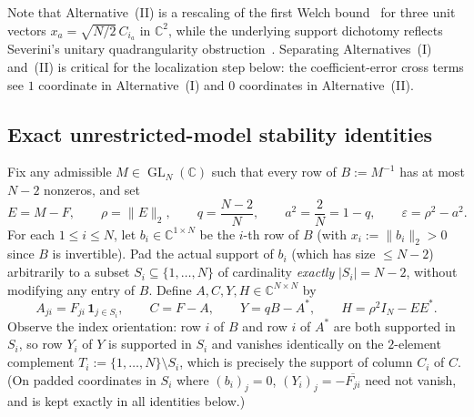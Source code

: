 \documentclass[11pt,reqno]{amsart}
\numberwithin{equation}{section}
\theoremstyle{definition}
\theoremstyle{remark}
\newcommand{\C}{\mathbb{C}}
\newcommand{\GL}{\operatorname{GL}}
\begin{document}
Note that Alternative~(II) is a rescaling of the first Welch bound~\cite{Wel74,DHC12} for three unit vectors $x_a = \sqrt{N/2}\,C_{i_a}$ in $\C^2$, while the underlying support dichotomy reflects Severini's unitary quadrangularity obstruction~\cite{Sev03}. Separating Alternatives~(I) and~(II) is critical for the localization step below: the coefficient-error cross terms see $1$ coordinate in Alternative~(I) and $0$ coordinates in Alternative~(II).

\subsection{Exact unrestricted-model stability identities}

Fix any admissible $M\in\GL_N(\C)$ such that every row of $B:=M^{-1}$ has at most $N-2$ nonzeros, and set
\begin{equation}
\label{eq:params-codim2}
E = M - F,\qquad \rho = \|E\|_2,\qquad q = \frac{N-2}{N},\qquad a^2 = \frac{2}{N} = 1 - q,\qquad \varepsilon = \rho^2 - a^2.
\end{equation}
For each $1\le i\le N$, let $b_i\in\C^{1\times N}$ be the $i$-th row of $B$ (with $x_i := \|b_i\|_2 > 0$ since $B$ is invertible). Pad the actual support of $b_i$ (which has size $\le N-2$) arbitrarily to a subset $S_i\subseteq\{1,\ldots,N\}$ of cardinality \emph{exactly} $|S_i|=N-2$, without modifying any entry of $B$. Define $A,C,Y,H\in\C^{N\times N}$ by
\begin{equation}
\label{eq:ACYH-def}
A_{ji} = F_{ji}\,\mathbf{1}_{j\in S_i},\qquad
C = F - A,\qquad
Y = qB - A^*,\qquad
H = \rho^2 I_N - EE^*.
\end{equation}
Observe the index orientation: row $i$ of $B$ and row $i$ of $A^*$ are both supported in $S_i$, so row $Y_i$ of $Y$ is supported in $S_i$ and vanishes identically on the $2$-element complement $T_i := \{1,\ldots,N\}\setminus S_i$, which is precisely the support of column $C_i$ of $C$. (On padded coordinates in $S_i$ where $(b_i)_j=0$, $(Y_i)_j = -\overline{F_{ji}}$ need not vanish, and is kept exactly in all identities below.)
\end{document}
